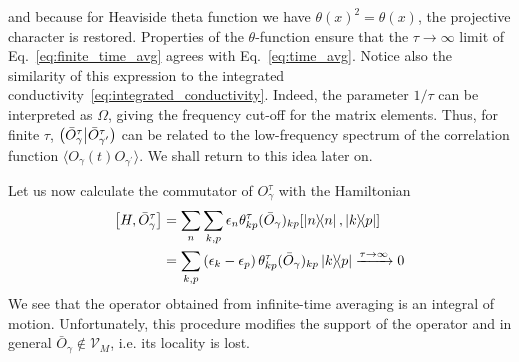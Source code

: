 and because for Heaviside theta function we have \(\theta(x)^2 = \theta(x)\), the projective character is restored.
Properties of the \(\theta\)-function ensure that the \(\tau\to\infty\) limit of Eq.~\eqref{eq:finite_time_avg}
agrees with Eq.~\eqref{eq:time_avg}. Notice also the similarity of this expression to the integrated conductivity~\eqref{eq:integrated_conductivity}.
Indeed, the parameter \(1/\tau\) can be interpreted as \(\Omega\), giving the frequency cut-off for the matrix elements.
Thus, for finite \(\tau\), \(\left(\bar{O}_{\gamma}^{\tau} \middle| \bar{O}_{\gamma^{\prime}}^{\tau}\right)\) can be related to the low-frequency spectrum of
the correlation function \(\langle O_{\gamma}(t) O_{\gamma^{\prime}} \rangle\). We shall return to this idea later on.

Let us now calculate the commutator of \(O_{\gamma}^{\tau}\) with the Hamiltonian
\begin{align}
  \comm{H}{\bar{O}_{\gamma}^{\tau}} & = \sum_n \sum_{k,p} \epsilon_n \theta_{kp}^{\tau} (\bar{O}_{\gamma})_{kp} \comm{ \ketbra{n}{n}}{ \ketbra{k}{p}} \nonumber                \\
                                    & = \sum_{k,p} \left(\epsilon_k-\epsilon_p\right) \theta_{kp}^{\tau} (\bar{O}_{\gamma})_{kp} \ketbra{k}{p} \xrightarrow{\tau \to \infty} 0
  \label{eq:time_averaged_commutator}
\end{align}
We see that the operator obtained from infinite-time averaging is an integral of motion. Unfortunately,
this procedure modifies the support of the operator and in general \(\bar{O}_{\gamma} \not\in \mathcal{V}_M\), i.e. its locality is lost.

